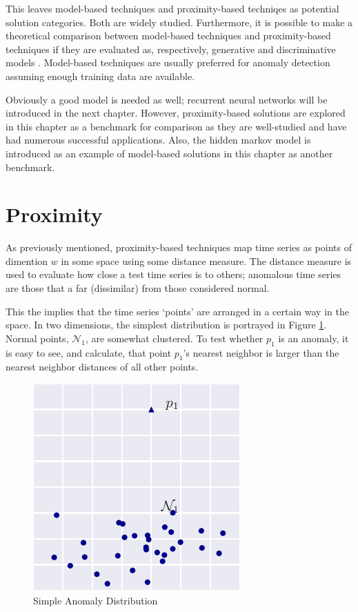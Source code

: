 This leaves model-based techniques and proximity-based techniqes as potential solution categories. Both are widely studied. Furthermore, it is possible to make a theoretical comparison between model-based techniques and proximity-based techniques if they are evaluated as, respectively, generative and discriminative models \cite{Ng2006}. Model-based techniques are usually preferred for anomaly detection \cite{Ngkvist2014} assuming enough training data are available.

Obviously a good model is needed as well; recurrent neural networks will be introduced in the next chapter. However, proximity-based solutions are explored in this chapter as a benchmark for comparison as they are well-studied and have had numerous successful applications. Also, the hidden markov model is introduced as an example of model-based solutions in this chapter as another benchmark.


\section[adprox]{Proximity}

As previously mentioned, proximity-based techniques map time series as points of dimention $w$ in some space using some distance measure. The distance measure is used to evaluate how close a test time series is to others; anomalous time series are those that a far (dissimilar) from those considered normal.

This the implies that the time series `points' are arranged in a certain way in the space. In two dimensions, the simplest distribution is portrayed in Figure \ref{fig:simple_dist}. Normal points, $\mathcal{N}_1$, are somewhat clustered. To test whether $p_1$ is an anomaly, it is easy to see, and calculate, that point $p_1$'s nearest neighbor is larger than the nearest neighbor distances of all other points.

\begin{figure}[H]
  \centering
  \includegraphics{figs/simple_dist.pdf}
  \caption{Simple Anomaly Distribution}
  \label{fig:simple_dist}
\end{figure}

